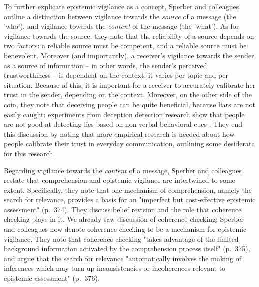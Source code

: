 To further explicate epistemic vigilance as a concept, Sperber and colleagues outline a distinction between vigilance towards the \emph{source} of a message (the 'who'), and vigilance towards the \emph{content} of the message (the 'what').
As for vigilance towards the source, they note that the reliability of a source depends on two factors: a reliable source must be competent, and a reliable source must be benevolent.
Moreover (and importantly), a receiver's vigilance towards the sender as a source of information -- in other words, the sender's perceived trustworthiness -- is dependent on the context: it varies per topic and per situation.
Because of this, it is important for a receiver to accurately calibrate her trust in the sender, depending on the context.
Moreover, on the other side of the coin, they note that deceiving people can be quite beneficial, because liars are not easily caught: experiments from deception detection research show that people are not good at detecting lies based on non-verbal behavioral cues \citep[see e.g.][]{Vrij00}.
They end this discussion by noting that more empirical research is needed about how people calibrate their trust in everyday communication, outlining some desiderata for this research.


Regarding vigilance towards the \emph{content} of a message, Sperber and colleagues restate that comprehension and epistemic vigilance are intertwined to some extent. Specifically, they note that one mechanism of comprehension, namely the search for relevance, provides a basis for an "imperfect but cost-effective epistemic assessment" (p.~374).
They discuss belief revision and the role that coherence checking plays in it. We already saw  discussion of coherence checking; Sperber and colleagues now denote coherence checking to be a mechanism for epistemic vigilance. They note that coherence checking "takes advantage of the limited background information activated by the comprehension process itself" (p.~375), and argue that the search for relevance "automatically involves the making of inferences which may turn up inconsistencies or incoherences relevant to epistemic assessment" (p.~376).


